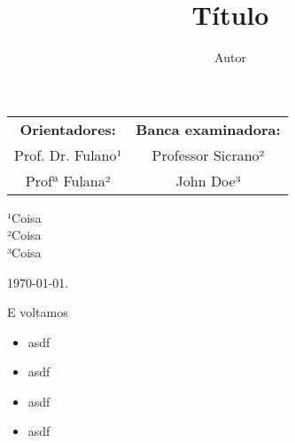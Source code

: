 \documentclass[xcolor=dvipsnames]{beamer}
\title[Título]{Título}
\author[Author]{Autor}
\begin{document}
\bgroup
{} %


\begin{frame}[plain]

\centering 


\bigskip

\setlength{\extrarowheight}{6pt} %
\begin{tabular}{cc}
\textbf{Orientadores:}   & \textbf{Banca examinadora:}  \\
Prof. Dr. Fulano¹     &  Professor Sicrano²\\
Profª Fulana² & John Doe³\\
\end{tabular}

\bigskip\bigskip

¹Coisa\\
²Coisa\\
³Coisa\\

\vfill 

\today. 

\end{frame}
\egroup 


\begin{frame}{E voltamos}
\begin{itemize}
    \item asdf \item asdf \item asdf \item asdf
\end{itemize}    
\end{frame}
\end{document}
